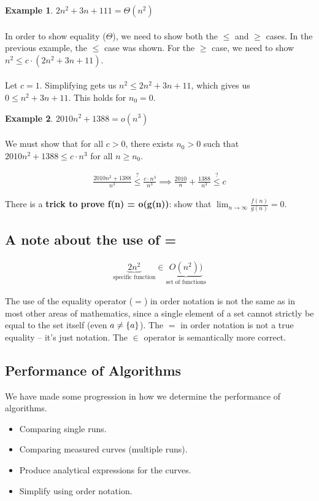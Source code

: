 \documentclass[]{article}
\theoremstyle{definition}
\newtheorem{ex}{Example}[section]
\DeclarePairedDelimiter{\set}{\lbrace}{\rbrace}
\begin{document}
			\begin{ex}
				$2n^2 + 3n + 11 1 = \Theta(n^2)$
				\\ \\
				In order to show equality ($\Theta$), we need to show both the $\le$ and $\ge$ cases. In the previous example, the $\le$ case was shown. For the $\ge$ case, we need to show $n^2 \le c \cdot (2n^2 + 3n + 11)$.
				\\ \\
				Let $c = 1$. Simplifying gets us $n^2 \le 2n^2 + 3n + 11$, which gives us $0 \le n^2 + 3n + 11$. This holds for $n_0 = 0$.
			\end{ex}
			
			\begin{ex}
				$2010n^2 + 1388 = o(n^3)$
				\\ \\
				We must show that for all $c > 0$, there exists $n_0 > 0$ such that $2010n^2 + 1388 \le c \cdot n^3$ for all $n \ge n_0$.
				
				\begin{align*}
					\frac{2010n^2+1388}{n^3} \stackrel{?}{\le} \frac{c \cdot n^3}{n^3} \implies \frac{2010}{n} + \frac{1388}{n^3} \stackrel{?}{\le} c
				\end{align*}
				
				There is a \textbf{trick to prove f(n) = o(g(n))}: show that $\lim_{n \to \infty}{}\frac{f(n)}{g(n)} = 0$.
			\end{ex}
		
		\subsection{A note about the use of =}
			\begin{align*}
				\underbrace{2n^2}_\text{specific function} \in \underbrace{O(n^2))}_\text{set of functions}
			\end{align*}
			
			The use of the equality operator ($=$) in order notation is not the same as in most other areas of mathematics, since a single element of a set cannot strictly be equal to the set itself (even $a \ne \set{a}$). The $=$ in order notation is not a true equality -- it's just notation. The $\in$ operator is semantically more correct.
		
		\subsection{Performance of Algorithms}
			We have made some progression in how we determine the performance of algorithms.
			\begin{itemize}
				\item Comparing single runs.
				\item Comparing measured curves (multiple runs).
				\item Produce analytical expressions for the curves.
				\item Simplify using order notation.
			\end{itemize}
			
\end{document}
